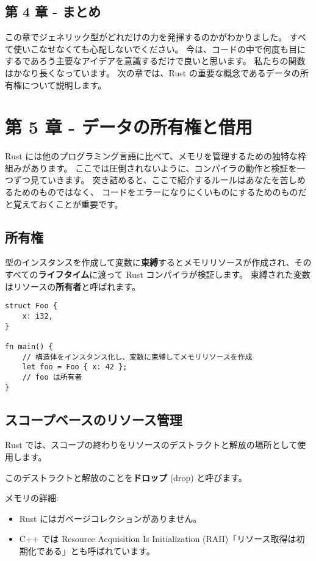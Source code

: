 \subsection{第 4 章 - まとめ}

この章でジェネリック型がどれだけの力を発揮するのかがわかりました。
すべて使いこなせなくても心配しないでください。
今は、コードの中で何度も目にするであろう主要なアイデアを意識するだけで良いと思います。
私たちの関数はかなり長くなっています。 次の章では、Rust
の重要な概念であるデータの所有権について説明します。

\section{第 5 章 - データの所有権と借用}

Rust
には他のプログラミング言語に比べて、メモリを管理するための独特な枠組みがあります。
ここでは圧倒されないように、コンパイラの動作と検証を一つずつ見ていきます。
突き詰めると、ここで紹介するルールはあなたを苦しめるためのものではなく、
コードをエラーになりにくいものにするためのものだと覚えておくことが重要です。

\subsection{所有権}

型のインスタンスを作成して変数に\textbf{束縛}するとメモリリソースが作成され、そのすべての\textbf{ライフタイム}に渡って
Rust コンパイラが検証します。
束縛された変数はリソースの\textbf{所有者}と呼ばれます。

\begin{verbatim}
struct Foo {
    x: i32,
}

fn main() {
    // 構造体をインスタンス化し、変数に束縛してメモリリソースを作成
    let foo = Foo { x: 42 };
    // foo は所有者
}
\end{verbatim}

\subsection{スコープベースのリソース管理}

Rust
では、スコープの終わりをリソースのデストラクトと解放の場所として使用します。

このデストラクトと解放のことを\textbf{ドロップ} (drop) と呼びます。

メモリの詳細:

\begin{itemize}
\item
  Rust にはガベージコレクションがありません。
\item
  C++ では Resource Acquisition Is Initialization
  (RAII)「リソース取得は初期化である」とも呼ばれています。
\end{itemize}

